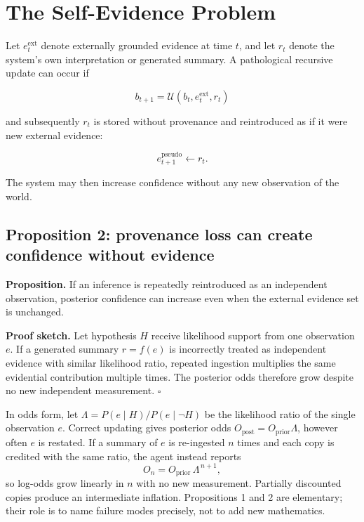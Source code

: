 \documentclass[11pt]{article}
\newcommand{\Update}{\mathcal{U}}
\begin{document}
\section{The Self-Evidence Problem}
\label{sec:self-evidence}

Let $e_t^{\mathrm{ext}}$ denote externally grounded evidence at time $t$, and let $r_t$ denote the system's own interpretation or generated summary. A pathological recursive update can occur if

\begin{equation}
    b_{t+1} = \Update(b_t, e_t^{\mathrm{ext}}, r_t)
\end{equation}

and subsequently $r_t$ is stored without provenance and reintroduced as if it were new external evidence:

\begin{equation}
    e_{t+1}^{\mathrm{pseudo}} \leftarrow r_t.
\end{equation}

The system may then increase confidence without any new observation of the world.

\subsection{Proposition 2: provenance loss can create confidence without evidence}

\textbf{Proposition.} If an inference is repeatedly reintroduced as an independent observation, posterior confidence can increase even when the external evidence set is unchanged.

\textbf{Proof sketch.} Let hypothesis $H$ receive likelihood support from one observation $e$. If a generated summary $r=f(e)$ is incorrectly treated as independent evidence with similar likelihood ratio, repeated ingestion multiplies the same evidential contribution multiple times. The posterior odds therefore grow despite no new independent measurement. $\square$

In odds form, let $\Lambda=P(e\mid H)/P(e\mid \neg H)$ be the likelihood ratio of the single observation $e$. Correct updating gives posterior odds $O_{\mathrm{post}}=O_{\mathrm{prior}}\Lambda$, however often $e$ is restated. If a summary of $e$ is re-ingested $n$ times and each copy is credited with the same ratio, the agent instead reports
\begin{equation}
    O_n = O_{\mathrm{prior}}\,\Lambda^{\,n+1},
\end{equation}
so log-odds grow linearly in $n$ with no new measurement. Partially discounted copies produce an intermediate inflation. Propositions 1 and 2 are elementary; their role is to name failure modes precisely, not to add new mathematics.
\end{document}
